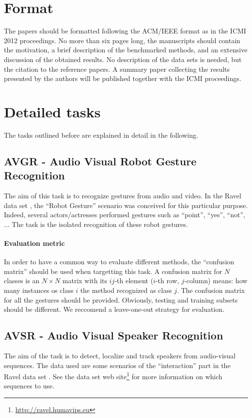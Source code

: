 \documentclass[a4paper]{article}
\begin{document}
\section*{Format}
The papers should be formatted following the ACM/IEEE format as in the ICMI 2012 proceedings. No more than six pages
long, the manuscripts should contain the motivation, a brief description of the benchmarked methods, and an extensive
discussion of the obtained results. No description of the data sets is needed, but the citation to the reference papers.
A summary paper collecting the results presented by the authors will be published together with the ICMI proceedings.

\section*{Detailed tasks}
The tasks outlined before are explained in detail in the following.

\subsection*{AVGR - Audio Visual Robot Gesture Recognition}
The aim of this task is to recognize gestures from audio and video. In the Ravel data set \cite{Ravel,Humavips}, the
``Robot
Gesture'' scenario was conceived for this particular purpose. Indeed, several actors/actresses performed gestures such
as ``point'', ``yes'', ``not'', ... The task is the isolated recognition of these robot gestures. 

\paragraph{Evaluation metric} In order to have a common way to evaluate different methods, the ``confusion matrix''
should be used when targetting this task. A confusion matrix for $N$ classes is an $N\times N$ matrix with its $ij$-th
element ($i$-th row, $j$-column) means: how many instances os class $i$ the method recognized as class $j$. The
confusion matrix for all the gestures should be provided. Obviously, testing and training subsets should be different.
We reccomend a leave-one-out strategy for evaluation.

\subsection*{AVSR - Audio Visual Speaker Recognition}
The aim of the task is to detect, localize and track speakers from audio-visual sequences. The data used are some
scenarios of the ``interaction'' part in the Ravel data set \cite{Ravel}. See the data set web
site\footnote{\url{http://ravel.humavips.eu}} for more information on which sequences to use.
\end{document}
